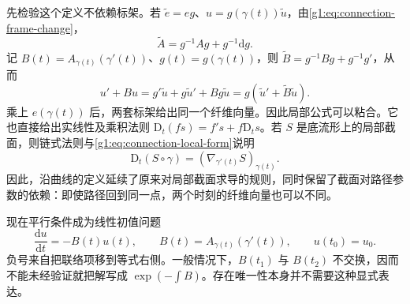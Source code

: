 先检验这个定义不依赖标架。若 \(\widetilde e=e g\)、\(u=g(\gamma(t))\widetilde u\)，由\eqref{g1:eq:connection-frame-change}，
\[
	\widetilde A=g^{-1}Ag+g^{-1}\mathrm{d}g.
\]
记 \(B(t)=A_{\gamma(t)}(\gamma'(t))\)、\(g(t)=g(\gamma(t))\)，则 \(\widetilde B=g^{-1}Bg+g^{-1}g'\)，从而
\[
	u'+Bu=g'\widetilde u+g\widetilde u'+Bg\widetilde u
	=g(\widetilde u'+\widetilde B\widetilde u).
\]
乘上 \(e(\gamma(t))\) 后，两套标架给出同一个纤维向量。因此局部公式可以粘合。它也直接给出实线性及乘积法则 \(\mathrm{D}_t(fs)=f's+f\mathrm{D}_ts\)。若 \(S\) 是底流形上的局部截面，则链式法则与\eqref{g1:eq:connection-local-form}说明
\[
	\mathrm{D}_t(S\circ\gamma)=(\nabla_{\gamma'(t)}S)_{\gamma(t)}.
\]
因此，沿曲线的定义延续了原来对局部截面求导的规则，同时保留了截面对路径参数的依赖：即使路径回到同一点，两个时刻的纤维向量也可以不同。

\ProseParagraphBreak

现在平行条件成为线性初值问题
\begin{equation}\label{g1:eq:parallel-transport-ode}
	\frac{\mathrm{d}u}{\mathrm{d}t}=-B(t)u(t),\qquad
	B(t)=A_{\gamma(t)}(\gamma'(t)),\qquad u(t_0)=u_0.
\end{equation}
负号来自把联络项移到等式右侧。一般情况下，\(B(t_1)\) 与 \(B(t_2)\) 不交换，因而不能未经验证就把解写成 \(\exp(-\int B)\)。存在唯一性本身并不需要这种显式表达。

